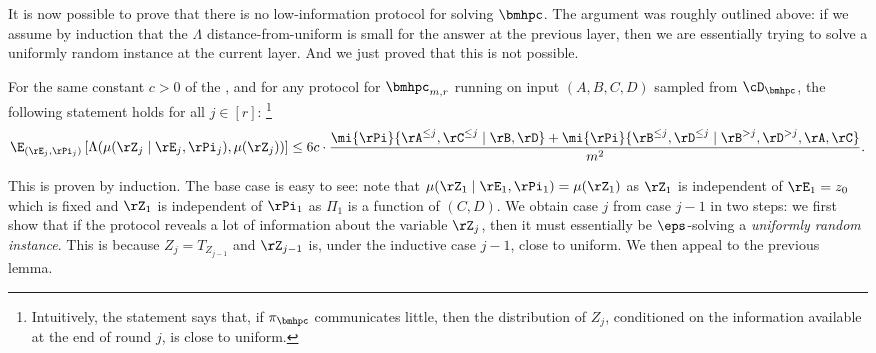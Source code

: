 \bigskip\noindent
It is now possible to prove that there is no low-information protocol for solving $\bmhpc$. The argument was roughly outlined above: if we assume by induction that the $\Lambda$ distance-from-uniform is small for the answer at the previous layer, then we are essentially trying to solve a uniformly random instance at the current layer. And we just proved that this is not possible.

\begin{lemma}\label{lem:mhpc-dist}
For the same constant $c > 0$ of the , and for any protocol
for $\bmhpc_{m,r}$ running on input $(A, B, C, D)$ sampled from
$\cD_{\bmhpc}$, the following statement holds for all $j \in
[r]$:%
\footnote{Intuitively, the statement says that, if $\pi_\bmhpc$
communicates little, then the distribution of $Z_j$, conditioned on the
information available at the end of round $j$, is close to uniform.}
\[
  \E_{(\rE_j, \rPi_j)}\left[\Lambda(\mu(\rZ_j \mid \rE_j, \rPi_j), \mu(\rZ_j))\right]
  \leq 6 c \cdot \frac{\mi{\rPi}{\rA^{\le j},\rC^{\le j} \mid \rB,\rD} + \mi{\rPi}{\rB^{\le j},\rD^{\le j} \mid \rB^{> j}, \rD^{> j}, \rA,\rC}}{m^2}.
\] 

\end{lemma}





This is proven by induction. The base case is easy to see: note that $\mu(\rZ_1
\mid \rE_1, \rPi_1) = \mu(\rZ_1)$ as $\rZ_1$ is independent of $\rE_1 = z_0$
which is fixed and $\rZ_1$ is independent of $\rPi_1$ as $\Pi_1$ is a function
of $(C,D)$.
We obtain case $j$ from case $j - 1$ in two steps: we first show that if the
protocol reveals a lot of information about the variable $\rZ_{j}$, then it must
essentially be $\eps$-solving a \textit{uniformly random instance}. This is
because $Z_{j} = T_{Z_{j-1}}$ and $\rZ_{j-1}$ is, under the inductive case
$j-1$, close to uniform.
We then appeal to the previous lemma.


